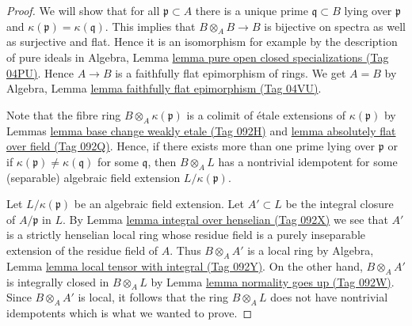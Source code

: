 \documentclass{amsart}
\theoremstyle{plain}
\theoremstyle{definition}
\theoremstyle{remark}
\numberwithin{equation}{subsection}
\begin{document}
\begin{proof}
We will show that for all $\mathfrak p \subset A$ there is a unique
prime $\mathfrak q \subset B$ lying over $\mathfrak p$ and
$\kappa(\mathfrak p) = \kappa(\mathfrak q)$.
This implies that $B \otimes_A B \to B$ is bijective on spectra
as well as surjective and flat. Hence it is an isomorphism
for example by the description of pure ideals in
Algebra, Lemma \href{https://stacks.math.columbia.edu/tag/04PU}{lemma pure open closed specializations (Tag 04PU)}.
Hence $A \to B$ is a faithfully flat epimorphism of rings. We get
$A = B$ by
Algebra, Lemma \href{https://stacks.math.columbia.edu/tag/04VU}{lemma faithfully flat epimorphism (Tag 04VU)}.

\medskip\noindent
Note that the fibre ring $B \otimes_A \kappa(\mathfrak p)$
is a colimit of \'etale extensions of $\kappa(\mathfrak p)$ by
Lemmas \href{https://stacks.math.columbia.edu/tag/092H}{lemma base change weakly etale (Tag 092H)} and
\href{https://stacks.math.columbia.edu/tag/092Q}{lemma absolutely flat over field (Tag 092Q)}.
Hence, if there exists more than one prime lying over $\mathfrak p$
or if $\kappa(\mathfrak p) \not = \kappa(\mathfrak q)$ for some $\mathfrak q$,
then $B \otimes_A L$ has a nontrivial idempotent for some (separable)
algebraic field extension $L/\kappa(\mathfrak p)$.

\medskip\noindent
Let $L/\kappa(\mathfrak p)$ be an algebraic field extension.
Let $A' \subset L$ be the integral closure of $A/\mathfrak p$ in $L$.
By Lemma \href{https://stacks.math.columbia.edu/tag/092X}{lemma integral over henselian (Tag 092X)}
we see that $A'$ is a strictly henselian local ring
whose residue field is a purely inseparable extension of the residue
field of $A$. Thus $B \otimes_A A'$ is a local ring by
Algebra, Lemma \href{https://stacks.math.columbia.edu/tag/092Y}{lemma local tensor with integral (Tag 092Y)}.
On the other hand, $B \otimes_A A'$ is integrally closed in
$B \otimes_A L$ by Lemma \href{https://stacks.math.columbia.edu/tag/092W}{lemma normality goes up (Tag 092W)}.
Since $B \otimes_A A'$ is local, it follows that the ring
$B \otimes_A L$ does not have nontrivial
idempotents which is what we wanted to prove.
\end{proof}
\end{document}
